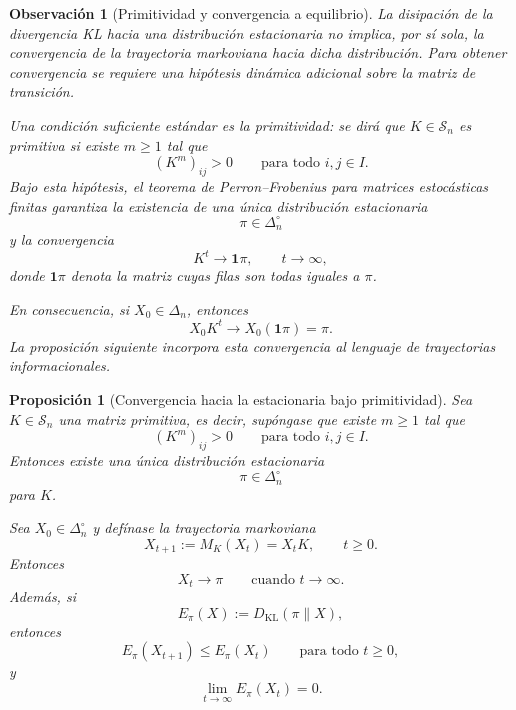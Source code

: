 ﻿\documentclass[12pt]{article}
\newtheorem{proposicion}{Proposición}[section]
\newtheorem{observacion}{Observación}[section]
\begin{document}
\begin{observacion}[Primitividad y convergencia a equilibrio]\label{obs:primitividad_convergencia_markov}
La disipación de la divergencia KL hacia una distribución estacionaria no implica, por sí sola, la convergencia de la trayectoria markoviana hacia dicha distribución. Para obtener convergencia se requiere una hipótesis dinámica adicional sobre la matriz de transición.

Una condición suficiente estándar es la primitividad: se dirá que \(K\in\mathcal S_n\) es primitiva si existe \(m\ge 1\) tal que
\[
(K^m)_{ij}>0
\qquad
\text{para todo }i,j\in I.
\]
Bajo esta hipótesis, el teorema de Perron--Frobenius para matrices estocásticas finitas garantiza la existencia de una única distribución estacionaria
\[
\pi\in\Delta_n^\circ
\]
y la convergencia
\[
K^t\longrightarrow \mathbf 1\pi,
\qquad t\to\infty,
\]
donde \(\mathbf 1\pi\) denota la matriz cuyas filas son todas iguales a \(\pi\).

En consecuencia, si \(X_0\in\Delta_n\), entonces
\[
X_0K^t\longrightarrow X_0(\mathbf 1\pi)=\pi.
\]
La proposición siguiente incorpora esta convergencia al lenguaje de trayectorias informacionales.
\end{observacion}


\begin{proposicion}[Convergencia hacia la estacionaria bajo primitividad]\label{prop:convergencia_primitiva_markov}
Sea \(K\in\mathcal S_n\) una matriz primitiva, es decir, supóngase que existe \(m\ge 1\) tal que
\[
(K^m)_{ij}>0
\qquad
\text{para todo }i,j\in I.
\]
Entonces existe una única distribución estacionaria
\[
\pi\in\Delta_n^\circ
\]
para \(K\).

Sea \(X_0\in\Delta_n^\circ\) y defínase la trayectoria markoviana
\[
X_{t+1}:=M_K(X_t)=X_tK,
\qquad t\ge 0.
\]
Entonces
\[
X_t\longrightarrow \pi
\qquad
\text{cuando }t\to\infty.
\]
Además, si
\[
E_\pi(X):=D_{\mathrm{KL}}(\pi\|X),
\]
entonces
\[
E_\pi(X_{t+1})\le E_\pi(X_t)
\qquad
\text{para todo }t\ge 0,
\]
y
\[
\lim_{t\to\infty}E_\pi(X_t)=0.
\]
\end{proposicion}
\end{document}

